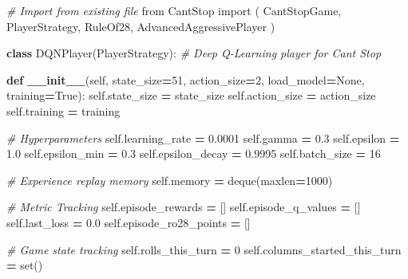 \documentclass[12pt]{article}
\newenvironment{Shaded}{\begin{snugshade}}{\end{snugshade}}
\newcommand{\BuiltInTok}[1]{#1}
\newcommand{\CommentTok}[1]{\textcolor[rgb]{0.56,0.35,0.01}{\textit{#1}}}
\newcommand{\DecValTok}[1]{\textcolor[rgb]{0.00,0.00,0.81}{#1}}
\newcommand{\FloatTok}[1]{\textcolor[rgb]{0.00,0.00,0.81}{#1}}
\newcommand{\FunctionTok}[1]{\textcolor[rgb]{0.13,0.29,0.53}{\textbf{#1}}}
\newcommand{\ImportTok}[1]{#1}
\newcommand{\KeywordTok}[1]{\textcolor[rgb]{0.13,0.29,0.53}{\textbf{#1}}}
\newcommand{\NormalTok}[1]{#1}
\newcommand{\OperatorTok}[1]{\textcolor[rgb]{0.81,0.36,0.00}{\textbf{#1}}}
\newcommand{\VariableTok}[1]{\textcolor[rgb]{0.00,0.00,0.00}{#1}}
\begin{document}
\begin{thesis}
\begin{Shaded}
\begin{Highlighting}[]
\CommentTok{\# Import from existing file}
\ImportTok{from}\NormalTok{ CantStop }\ImportTok{import}\NormalTok{ (}
\NormalTok{    CantStopGame, }
\NormalTok{    PlayerStrategy, }
\NormalTok{    RuleOf28,}
\NormalTok{    AdvancedAggressivePlayer}
\NormalTok{)}

\KeywordTok{class}\NormalTok{ DQNPlayer(PlayerStrategy):}
    \CommentTok{\# Deep Q{-}Learning player for Can\textquotesingle{}t Stop}
    
    \KeywordTok{def} \FunctionTok{\_\_init\_\_}\NormalTok{(}\VariableTok{self}\NormalTok{, state\_size}\OperatorTok{=}\DecValTok{51}\NormalTok{, action\_size}\OperatorTok{=}\DecValTok{2}\NormalTok{, }
\NormalTok{                load\_model}\OperatorTok{=}\VariableTok{None}\NormalTok{, training}\OperatorTok{=}\VariableTok{True}\NormalTok{):}
        \VariableTok{self}\NormalTok{.state\_size }\OperatorTok{=}\NormalTok{ state\_size}
        \VariableTok{self}\NormalTok{.action\_size }\OperatorTok{=}\NormalTok{ action\_size}
        \VariableTok{self}\NormalTok{.training }\OperatorTok{=}\NormalTok{ training}
        
        \CommentTok{\# Hyperparameters}
        \VariableTok{self}\NormalTok{.learning\_rate }\OperatorTok{=} \FloatTok{0.0001}
        \VariableTok{self}\NormalTok{.gamma }\OperatorTok{=} \FloatTok{0.3} 
        \VariableTok{self}\NormalTok{.epsilon }\OperatorTok{=} \FloatTok{1.0}
        \VariableTok{self}\NormalTok{.epsilon\_min }\OperatorTok{=} \FloatTok{0.3}
        \VariableTok{self}\NormalTok{.epsilon\_decay }\OperatorTok{=} \FloatTok{0.9995}
        \VariableTok{self}\NormalTok{.batch\_size }\OperatorTok{=} \DecValTok{16}
        
        \CommentTok{\# Experience replay memory}
        \VariableTok{self}\NormalTok{.memory }\OperatorTok{=}\NormalTok{ deque(maxlen}\OperatorTok{=}\DecValTok{1000}\NormalTok{)}
        
        \CommentTok{\# Metric Tracking}
        \VariableTok{self}\NormalTok{.episode\_rewards }\OperatorTok{=}\NormalTok{ []         }
        \VariableTok{self}\NormalTok{.episode\_q\_values }\OperatorTok{=}\NormalTok{ []          }
        \VariableTok{self}\NormalTok{.last\_loss }\OperatorTok{=} \FloatTok{0.0}                
        \VariableTok{self}\NormalTok{.episode\_ro28\_points }\OperatorTok{=}\NormalTok{ []}

        \CommentTok{\# Game state tracking}
        \VariableTok{self}\NormalTok{.rolls\_this\_turn }\OperatorTok{=} \DecValTok{0}
        \VariableTok{self}\NormalTok{.columns\_started\_this\_turn }\OperatorTok{=} \BuiltInTok{set}\NormalTok{()}
        

\end{Highlighting}
\end{Shaded}
\end{thesis}
\end{document}
